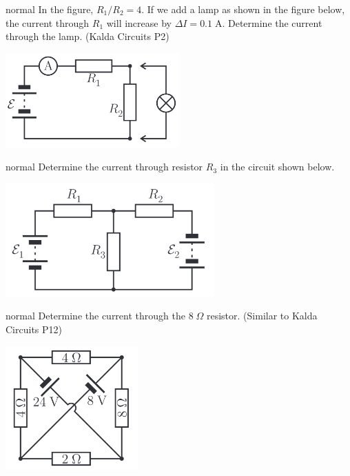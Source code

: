 \hypertarget{P11}{}
\begin{solution}{normal} %
In the figure, $R_1/R_2=4$. If we add a lamp as shown in the figure below, the current through $R_1$ will increase by $\Delta I= 0.1\;\text{A}$. Determine the current through the lamp. (Kalda Circuits P2)
\begin{center}
    \includegraphics[width=0.5\textwidth]{S1 Figures/S1-11.png}
\end{center}
\end{solution}

\hypertarget{P12}{}
\begin{solution}{normal} %
Determine the current through resistor $R_3$ in the circuit shown below.
\begin{center}
    \includegraphics[width=0.6\textwidth]{S1 Figures/S1-12.png}
\end{center}
\end{solution}

\hypertarget{P13}{}
\begin{solution}{normal} %
Determine the current through the $8\;\Omega$ resistor. (Similar to Kalda Circuits P12)
\begin{center}
    \includegraphics[width=0.38\textwidth]{S1 Figures/S1-13.png}
\end{center}
\end{solution}

